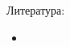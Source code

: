 \documentclass[12pt,a4paper]{article}
\date{}
\begin{document}
    \maketitle

    \listoftodos[TODOs]

    \tableofcontents

    \vspace{2em}

    Литература:
    \begin{itemize}
        \item 
    \end{itemize}

    
\end{document}
